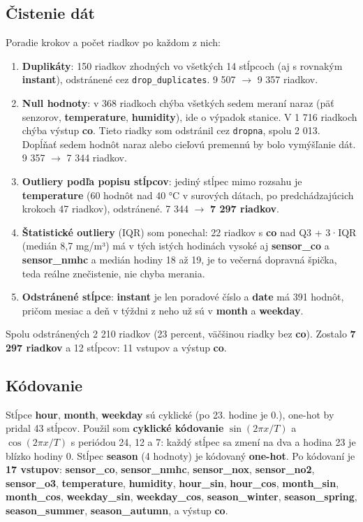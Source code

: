 \documentclass[11pt,a4paper]{article}
\begin{document}
\subsection{Čistenie dát}
Poradie krokov a počet riadkov po každom z nich:
\begin{enumerate}[nosep]
  \item \textbf{Duplikáty}: 150 riadkov zhodných vo všetkých 14 stĺpcoch (aj s rovnakým \textbf{instant}),
  odstránené cez \texttt{drop\_duplicates}. 9 507 $\rightarrow$ 9 357 riadkov.
  \item \textbf{Null hodnoty}: v 368 riadkoch chýba všetkých sedem meraní naraz (päť senzorov,
  \textbf{temperature}, \textbf{humidity}), ide o výpadok stanice. V 1 716 riadkoch chýba výstup \textbf{co}.
  Tieto riadky som odstránil cez \texttt{dropna}, spolu 2 013. Dopĺňať sedem hodnôt naraz alebo cieľovú
  premennú by bolo vymýšľanie dát. 9 357 $\rightarrow$ 7 344 riadkov.
  \item \textbf{Outliery podľa popisu stĺpcov}: jediný stĺpec mimo rozsahu je \textbf{temperature}
  (60 hodnôt nad 40 °C v surových dátach, po predchádzajúcich krokoch 47 riadkov), odstránené.
  7 344 $\rightarrow$ \textbf{7 297 riadkov}.
  \item \textbf{Štatistické outliery} (IQR) som ponechal: 22 riadkov s \textbf{co} nad Q3 + 3·IQR (medián
  8,7 mg/m³) má v tých istých hodinách vysoké aj \textbf{sensor\_co} a \textbf{sensor\_nmhc} a medián hodiny
  18 až 19, je to večerná dopravná špička, teda reálne znečistenie, nie chyba merania.
  \item \textbf{Odstránené stĺpce}: \textbf{instant} je len poradové číslo a \textbf{date} má 391 hodnôt,
  pričom mesiac a deň v týždni z neho už sú v \textbf{month} a \textbf{weekday}.
\end{enumerate}
Spolu odstránených 2 210 riadkov (23 percent, väčšinou riadky bez \textbf{co}). Zostalo \textbf{7 297 riadkov}
a 12 stĺpcov: 11 vstupov a výstup \textbf{co}.

\subsection{Kódovanie}
Stĺpce \textbf{hour}, \textbf{month}, \textbf{weekday} sú cyklické (po 23. hodine je 0.), one-hot by pridal 43 stĺpcov.
Použil som \textbf{cyklické kódovanie} $\sin(2\pi x/T)$ a $\cos(2\pi x/T)$ s periódou 24, 12 a 7: každý stĺpec sa
zmení na dva a hodina 23 je blízko hodiny 0. Stĺpec \textbf{season} (4 hodnoty) je kódovaný \textbf{one-hot}.
Po kódovaní je \textbf{17 vstupov}: \textbf{sensor\_co}, \textbf{sensor\_nmhc}, \textbf{sensor\_nox}, \textbf{sensor\_no2}, \textbf{sensor\_o3}, \textbf{temperature}, \textbf{humidity}, \textbf{hour\_sin}, \textbf{hour\_cos}, \textbf{month\_sin}, \textbf{month\_cos}, \textbf{weekday\_sin}, \textbf{weekday\_cos}, \textbf{season\_winter}, \textbf{season\_spring}, \textbf{season\_summer}, \textbf{season\_autumn}, a výstup \textbf{co}.
\end{document}
